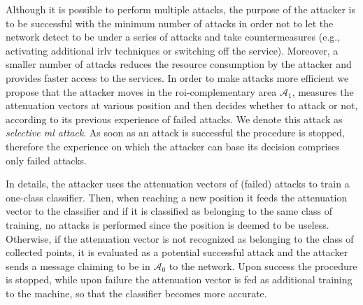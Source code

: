 \documentclass[draftcls,onecolumn,12pt]{IEEEtran}
\begin{document}


Although it is possible to perform multiple attacks, the purpose of the attacker is to be successful with the minimum number of attacks in order not to let the network detect to be under a series of attacks and take countermeasures (e.g., activating additional \ac{irlv} techniques or switching off the service). Moreover, a smaller number of attacks reduces the resource consumption by the attacker and provides faster access to the services. In order to make attacks more efficient we propose that the attacker moves in the \ac{roi}-complementary area $\mathcal A_1$, measures the attenuation vectors at various position and then decides whether to attack or not, according to its previous experience of failed attacks. We denote this attack as {\em selective \ac{ml} attack}. As soon as an attack is successful the procedure is stopped, therefore the experience on which the attacker can base its decision comprises only failed attacks.

In details, the attacker uses the attenuation vectors of (failed) attacks to train a one-class classifier. Then, when reaching a new position it feeds the attenuation vector to the classifier and if it is classified as belonging to the same class of training, no attacks is performed since the position is deemed to be useless. Otherwise, if the attenuation vector is not recognized as belonging to the class of collected points, it is evaluated as a potential successful attack and the attacker sends a message claiming to be in $\mathcal A_0$ to  the network. Upon success the procedure is stopped, while upon failure the attenuation vector is fed as additional training to the machine, so that the classifier becomes more accurate.  

\end{document}
